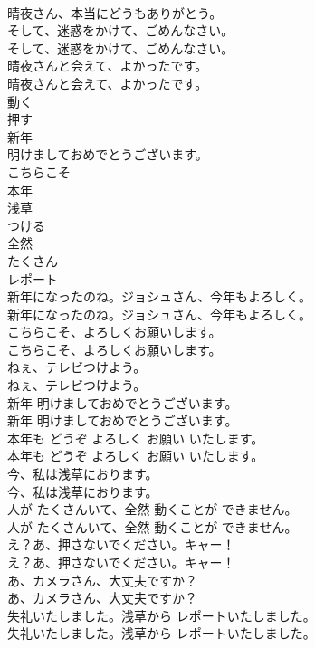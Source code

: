 \documentclass[8pt]{extreport}
\begin{document}
\begin{CJK}{UTF8}{min}
\\	晴夜さん、本当にどうもありがとう。 
\\	そして、迷惑をかけて、ごめんなさい。	
\\	そして、迷惑をかけて、ごめんなさい。 
\\	晴夜さんと会えて、よかったです。	
\\	晴夜さんと会えて、よかったです。 
\\	動く
\\	押す
\\	新年
\\	明けましておめでとうございます。
\\	こちらこそ
\\	本年
\\	浅草
\\	つける
\\	全然
\\	たくさん
\\	レポート
\\	新年になったのね。ジョシュさん、今年もよろしく。	
\\	新年になったのね。ジョシュさん、今年もよろしく。 
\\	こちらこそ、よろしくお願いします。	
\\	こちらこそ、よろしくお願いします。 
\\	ねぇ、テレビつけよう。	
\\	ねぇ、テレビつけよう。 
\\	新年 明けましておめでとうございます。	
\\	新年 明けましておめでとうございます。 
\\	本年も どうぞ よろしく お願い いたします。	
\\	本年も どうぞ よろしく お願い いたします。 
\\	今、私は浅草におります。	
\\	今、私は浅草におります。 
\\	人が たくさんいて、全然 動くことが できません。	
\\	人が たくさんいて、全然 動くことが できません。 
\\	え？あ、押さないでください。キャー！	
\\	え？あ、押さないでください。キャー！ 
\\	あ、カメラさん、大丈夫ですか？	
\\	あ、カメラさん、大丈夫ですか？ 
\\	失礼いたしました。浅草から レポートいたしました。	
\\	失礼いたしました。浅草から レポートいたしました。 

\end{CJK}
\end{document}
